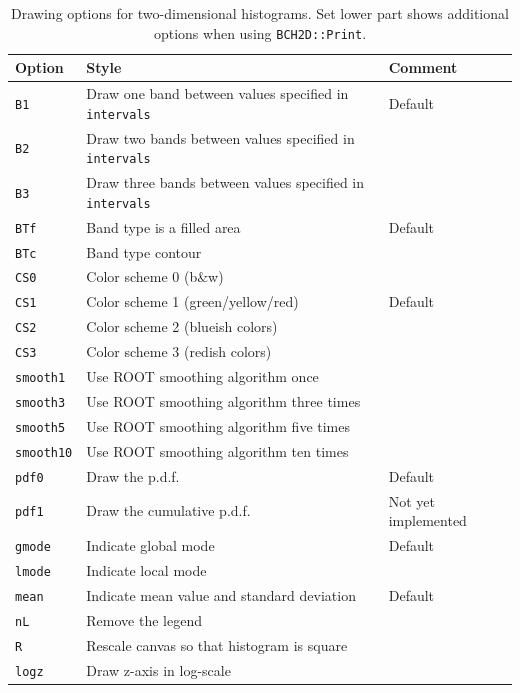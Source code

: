 \documentclass[11pt, a4paper]{article}
\begin{document}
\begin{table}[ht!]
\caption{Drawing options for two-dimensional histograms. Set lower
  part shows additional options when using \texttt{BCH2D::Print}.
\label{table:draw2d}}
\begin{center}
\begin{tabular}{@{}lll@{}}
\toprule
Option & Style & Comment \\
\midrule
\verb|B1| & Draw one band between values specified in \verb|intervals| & Default  \\
\verb|B2| & Draw two bands between values specified in \verb|intervals| & \\
\verb|B3| & Draw three bands between values specified in \verb|intervals| & \\
\verb|BTf| & Band type is a filled area & Default \\
\verb|BTc| & Band type contour & \\
\verb|CS0| & Color scheme 0 (b\&w) & \\
\verb|CS1| & Color scheme 1 (green/yellow/red) & Default  \\
\verb|CS2| & Color scheme 2 (blueish colors) &  \\
\verb|CS3| & Color scheme 3 (redish colors) & \\
\verb|smooth1| & Use ROOT smoothing algorithm once & \\
\verb|smooth3| & Use ROOT smoothing algorithm three times & \\
\verb|smooth5| & Use ROOT smoothing algorithm five times & \\
\verb|smooth10| & Use ROOT smoothing algorithm ten times & \\
\verb|pdf0| & Draw the p.d.f. & Default  \\
\verb|pdf1| & Draw the cumulative p.d.f. & Not yet implemented \\
\verb|gmode| & Indicate global mode & Default \\
\verb|lmode| & Indicate local mode &  \\
\verb|mean| & Indicate mean value and standard deviation & Default \\
\verb|nL| & Remove the legend &  \\
\midrule
\verb|R| & Rescale canvas so that histogram is square & \\
\verb|logz| & Draw z-axis in log-scale & \\
\bottomrule
\end{tabular}
\end{center}
\end{table}
\end{document}
